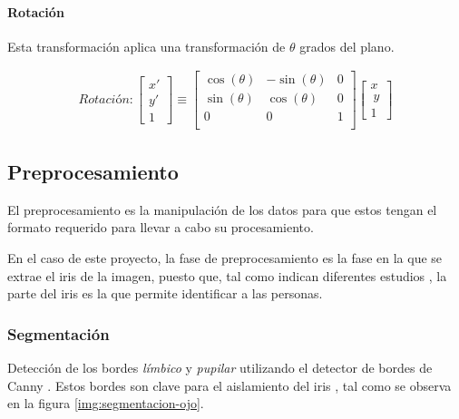 \paragraph{Rotación}

Esta transformación aplica una transformación de $\theta$ grados del plano.



\begin{gather}
	Rotación:
	\begin{bmatrix} x' \\ y' \\ 1 \end{bmatrix}
	\equiv
	 \begin{bmatrix}
	  \cos(\theta) &-\sin(\theta) & 0 \\
	  \sin(\theta) & \cos(\theta) & 0 \\
	  0 & 0 & 1 \\
	  \end{bmatrix}
	  \begin{bmatrix} x \\\ y \\ 1 \end{bmatrix}
\end{gather}


\subsection{Preprocesamiento}

El preprocesamiento es la manipulación de los datos para que estos tengan el formato requerido para llevar a cabo su procesamiento.

En el caso de este proyecto, la fase de preprocesamiento es la fase en la que se extrae el iris de la imagen, puesto que, tal como indican diferentes estudios \cite{tfg_iris_2020} \cite{abdullah_iris_2015} \cite{malgheet_iris_2021} \cite{boyd_post-mortem_2020} \cite{liu_efficient_2021} \cite{szymkowski_iris-based_2021} \cite{lozej_end--end_2018}, la parte del iris es la que 
permite identificar a las personas.

\subsubsection{Segmentación} \label{subsubsec:segmentacion}

Detección de los bordes \textit{límbico} y \textit{pupilar} utilizando el detector de bordes de Canny \cite{4767851}. Estos bordes son clave para el aislamiento del iris \cite{tfg_iris_2020}, tal como se observa en la figura \ref{img:segmentacion-ojo}.

